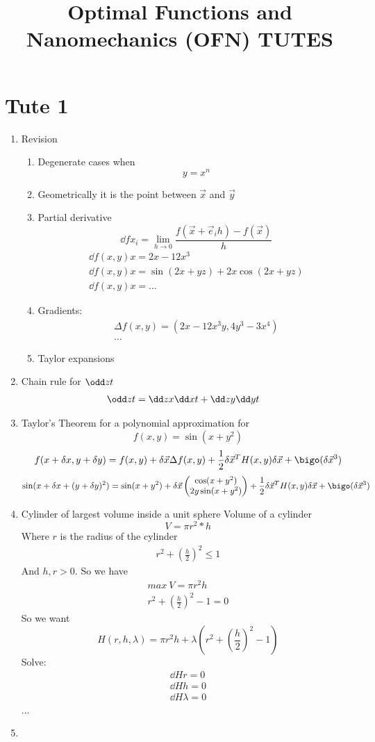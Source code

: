\documentclass{X:/Documents/Coding/Latex/myassignment}
\title{Optimal Functions and Nanomechanics (OFN) TUTES}
\begin{document}
\section{Tute 1}
\begin{enumerate}
\item Revision
	\begin{enumerate}
			\item Degenerate cases when 
		\[y=x^n\]
		\item Geometrically it is the point between $\vec x$ and $\vec y$
		\item Partial derivative
		\[\dd f{x_i} = \lim_{h\to 0 } \frac{f(\vec x + \vec e_i h) - f(\vec x)}{h}\]
		\begin{align*}
			\dd{f(x,y)}{x} = 2x - 12x^3\\
			\dd{f(x,y)}{x} = \sin(2x+yz) + 2x\cos(2x+yz)\\
			\dd{f(x,y)}{x} = \ldots
		\end{align*}
		\item Gradients:
		\begin{align*}
			\Delta f(x,y) = \left(2x-12x^3y, 4y^3 - 3x^4\right)\\
			\ldots
		\end{align*}
		\item Taylor expansions
	\end{enumerate}
	\item Chain rule for $\odd zt$
	\begin{align*}
		\odd zt &= \dd zx \dd xt + \dd zy \dd yt
	\end{align*}
	\item Taylor's Theorem for a polynomial approximation for 
	\[f(x,y) = \sin(x+y^2)\]
	\[f(x+\delta x, y+ \delta y) = f(x,y) + \delta \vec x \Delta f(x,y) + \frac12 \delta \vec x^T H(x,y) \delta \vec x + \bigo(\delta \vec x ^3)\]
	\[\sin(x+\delta x+(y+\delta y)^2) = \sin(x+y^2) + \delta \vec x \begin{pmatrix}
		\cos(x+y^2)\\
		2y\sin(x+y^2)
	\end{pmatrix} + \frac12 \delta \vec x^T H(x,y) \delta \vec x + \bigo(\delta \vec x ^3)\]
	\item Cylinder of largest volume inside a unit sphere
	Volume of a cylinder 
	\[V = \pi r^2 * h\]
	Where $r$ is the radius of the cylinder
	\begin{align*}
		r^2 + \left(\frac{h}{2}\right)^2 \leq 1
	\end{align*}
	And $h,r > 0$.
	So we have
	\begin{align*}
		max \ V = \pi r^2h\\
		r^2 + \left(\frac{h}{2}\right)^2 -1 =0
	\end{align*}
	So we want
	\[H(r,h,\lambda) = \pi r^2 h + \lambda \left(r^2 + \left(\frac{h}{2}\right)^2 -1\right)\]
	Solve:
	\begin{align*}
	 \dd H r = 0 \\
	 \dd H h = 0\\
	 \dd H \lambda = 0	
	 \end{align*} ...

	 

	 \item 
\end{enumerate}
\end{document}
